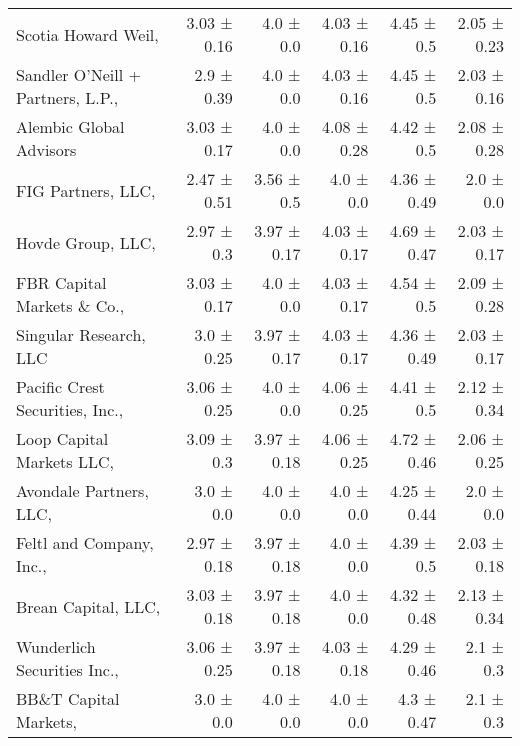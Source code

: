\begin{tabular}{lrrrrr}
Scotia Howard Weil,  & 3.03 ± 0.16 & 4.0 ± 0.0 & 4.03 ± 0.16 & 4.45 ± 0.5 & 2.05 ± 0.23 \\
Sandler O'Neill + Partners, L.P.,  & 2.9 ± 0.39 & 4.0 ± 0.0 & 4.03 ± 0.16 & 4.45 ± 0.5 & 2.03 ± 0.16 \\
Alembic Global Advisors & 3.03 ± 0.17 & 4.0 ± 0.0 & 4.08 ± 0.28 & 4.42 ± 0.5 & 2.08 ± 0.28 \\
FIG Partners, LLC,  & 2.47 ± 0.51 & 3.56 ± 0.5 & 4.0 ± 0.0 & 4.36 ± 0.49 & 2.0 ± 0.0 \\
Hovde Group, LLC,  & 2.97 ± 0.3 & 3.97 ± 0.17 & 4.03 ± 0.17 & 4.69 ± 0.47 & 2.03 ± 0.17 \\
FBR Capital Markets \& Co.,  & 3.03 ± 0.17 & 4.0 ± 0.0 & 4.03 ± 0.17 & 4.54 ± 0.5 & 2.09 ± 0.28 \\
Singular Research, LLC & 3.0 ± 0.25 & 3.97 ± 0.17 & 4.03 ± 0.17 & 4.36 ± 0.49 & 2.03 ± 0.17 \\
Pacific Crest Securities, Inc.,  & 3.06 ± 0.25 & 4.0 ± 0.0 & 4.06 ± 0.25 & 4.41 ± 0.5 & 2.12 ± 0.34 \\
Loop Capital Markets LLC,  & 3.09 ± 0.3 & 3.97 ± 0.18 & 4.06 ± 0.25 & 4.72 ± 0.46 & 2.06 ± 0.25 \\
Avondale Partners, LLC,  & 3.0 ± 0.0 & 4.0 ± 0.0 & 4.0 ± 0.0 & 4.25 ± 0.44 & 2.0 ± 0.0 \\
Feltl and Company, Inc.,  & 2.97 ± 0.18 & 3.97 ± 0.18 & 4.0 ± 0.0 & 4.39 ± 0.5 & 2.03 ± 0.18 \\
Brean Capital, LLC,  & 3.03 ± 0.18 & 3.97 ± 0.18 & 4.0 ± 0.0 & 4.32 ± 0.48 & 2.13 ± 0.34 \\
Wunderlich Securities Inc.,  & 3.06 ± 0.25 & 3.97 ± 0.18 & 4.03 ± 0.18 & 4.29 ± 0.46 & 2.1 ± 0.3 \\
BB\&T Capital Markets,  & 3.0 ± 0.0 & 4.0 ± 0.0 & 4.0 ± 0.0 & 4.3 ± 0.47 & 2.1 ± 0.3 \\
\bottomrule
\end{tabular}

\newpage

